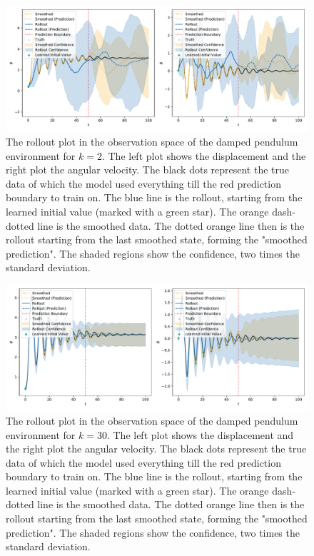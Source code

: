 		\begin{figure}
			\centering
			\includegraphics[width=\linewidth]{figures/results/pendulum-damped/run-latent-dim-02/rollout-observations-N0.pdf}
			\caption[Rollout of the damped pendulum experiment for 2 latent dimensions]{The rollout plot in the observation space of the damped pendulum environment for \(k = 2\). The left plot shows the displacement and the right plot the angular velocity. The black dots represent the true data of which the model used everything till the red prediction boundary to train on. The blue line is the rollout, starting from the learned initial value (marked with a green star). The orange dash-dotted line is the smoothed data. The dotted orange line then is the rollout starting from the last smoothed state, forming the "smoothed prediction". The shaded regions show the confidence, \ie two times the standard deviation.}
			\label{fig:pendulumDampedRolloutL02}
		\end{figure}

		\begin{figure}
			\centering
			\includegraphics[width=\linewidth]{figures/results/pendulum-damped/run-latent-dim-30/rollout-observations-N0.pdf}
			\caption[Rollout of the damped pendulum experiment for 30 latent dimensions]{The rollout plot in the observation space of the damped pendulum environment for \(k = 30\). The left plot shows the displacement and the right plot the angular velocity. The black dots represent the true data of which the model used everything till the red prediction boundary to train on. The blue line is the rollout, starting from the learned initial value (marked with a green star). The orange dash-dotted line is the smoothed data. The dotted orange line then is the rollout starting from the last smoothed state, forming the "smoothed prediction". The shaded regions show the confidence, \ie two times the standard deviation.}
			\label{fig:pendulumDampedRolloutL30}
		\end{figure}

